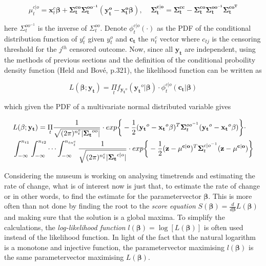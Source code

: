 \documentclass[]{article}
\begin{document}
\[
\mu_t^{c|o} = \mathbf{x}_t^c\mathbf{\beta} + \mathbf{\Sigma_t^{co}}\mathbf{\Sigma_t^{{oo}^{-1}}}(\mathbf{y_t^o}-\mathbf{x_t^o\beta}), \;\;\;\; \mathbf{\Sigma_t^{c|o}} = \mathbf{\Sigma_t^{cc}}-\mathbf{\Sigma_t^{co}}\mathbf{\Sigma_t^{{oo}^{-1}}}\mathbf{\Sigma_t^{co^{T}}}
\]

here \(\Sigma_t^{oo^{-1}}\) is the inverse of \(\Sigma_t^{oo}\). Denote
\(\phi_t^{c|o}(\cdot)\) as the PDF of the conditional distribution
function of \(y_t^c\) given \(y_t^o\) and \(\mathbf{c_t}\) the \(n_t^c\)
vector where \(c_{tj}\) is the censoring threshold for the \(j^{th}\)
censored outcome. Now, since all \(\mathbf{y_t}\) are independent, using
the methods of previous sections and the definition of the conditional
proboility density function (Held and Bové, p.321), the likelihood
function can be written as

\[
L(\mathbf{\beta};\mathbf{y_t}) = \underset{t}{\Pi} f_{\mathbf{y_t}^o}(\mathbf{y_t}^o|\mathbf{\beta})\cdot \phi_t^{c|o}(\mathbf{c_t}|\mathbf{\beta})
\]

which given the PDF of a multivariate normal distributed variable gives

\[
\begin{aligned}
& L(\mathbf{\beta};\mathbf{y_t}) = \underset{t}{\Pi} \frac{1}{\sqrt{(2\pi)^{n_t^o}|\mathbf{\Sigma_t}^{oo}|}}\cdot exp\bigg{\{}-\frac{1}{2}(\mathbf{y_t}^o-\mathbf{x_t}^o\mathbf{\beta})^T\mathbf{\Sigma}_t^{oo^{-1}}(\mathbf{y_t}^o-\mathbf{x_t}^o\mathbf{\beta})\bigg{\}} \cdot \\
& \int_{-\infty}^{n_{t1}}\int_{-\infty}^{n_{t2}}\cdots\int_{-\infty}^{n_{tn_t^c}} \frac{1}{\sqrt{(2\pi)^{n_t^c}|\mathbf{\Sigma_t}^{c|o}|}}\cdot exp \bigg{\{}-\frac{1}{2}(\mathbf{z}-\mathbf{\mu^{c|o}})^T\mathbf{\Sigma}_t^{c|o^{-1}}(\mathbf{z}-\mathbf{\mu^{c|o}})\bigg{\}}
\end{aligned}
\]

Considering the museum is working on analysing timetrends and estimating
the rate of change, what is of interest now is just that, to estimate
the rate of change or in other words, to find the estimate for the
parametervector \(\mathbf{\beta}\). This is more often than not done by
finding the root to the \emph{score equation}
\(S(\mathbf{\beta}) = \frac{d}{d\mathbf{\beta}}L(\mathbf{\beta})\) and
making sure that the solution is a global maxima. To simplify the
calculations, the \emph{log-likelihood function}
\(l(\mathbf{\beta})=\log[L(\mathbf{\beta})]\) is often used instead of
the likelihood function. In light of the fact that the natural logarithm
is a monotone and injective function, the parametervector maximising
\(l(\mathbf{\beta})\) is the same parametervector maximising
\(L(\mathbf{\beta})\).
\end{document}

